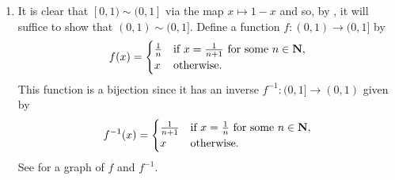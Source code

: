 \documentclass{lew98_solutions}
\begin{document}
\begin{solution}
\begin{enumerate}
        \item It is clear that \( [0, 1) \sim (0, 1] \) via the map \( x \mapsto 1 - x \) and so, by , it will suffice to show that \( (0, 1) \sim (0, 1] \). Define a function \( f : (0, 1) \to (0, 1] \) by
        \[
            f(x) = \begin{cases}
                \tfrac{1}{n} & \text{if } x = \tfrac{1}{n + 1} \text{ for some } n \in \mathbf{N}, \\
                x & \text{otherwise}.
            \end{cases}
        \]
        This function is a bijection since it has an inverse \( f^{-1} : (0, 1] \to (0, 1) \) given by
        \[
            f^{-1}(x) = \begin{cases}
                \tfrac{1}{n + 1} & \text{if } x = \tfrac{1}{n} \text{ for some } n \in \mathbf{N}, \\
                x & \text{otherwise}.
            \end{cases}
        \]
        See  for a graph of \( f \) and \( f^{-1} \).


\end{enumerate}
\end{solution}
\end{document}
